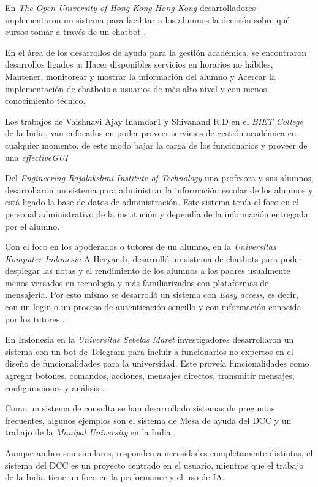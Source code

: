     \par En \textit{The Open University of Hong Kong Hong Kong} desarrolladores implementaron un sistema para facilitar a los alumnos la decisión sobre qué cursos tomar a través de un chatbot \cite{ChunHo2018}.
    
    \par En el área de los desarrollos de ayuda para la gestión académica, se encontraron desarrollos ligados a: Hacer disponibles servicios en horarios no hábiles, Mantener, monitorear y mostrar la información del alumno y Acercar la implementación de chatbots a usuarios de más alto nivel y con menos conocimiento técnico.
    
    \par Los trabajos de Vaishnavi Ajay Inamdar1 y Shivanand R.D en el \textit{BIET College} de la India, van enfocados en poder proveer servicios de gestión académica en cualquier momento, de este modo bajar la carga de los funcionarios y proveer de una \textit{\gls{effectiveGUI}} \cite{Journal2019}
    
    \par Del \textit{Engineering Rajalakshmi Institute of Technology} una profesora y sus alumnos, desarrollaron un sistema para administrar la información escolar de los alumnos y está ligado la base de datos de administración. Este sistema tenía el foco en el personal administrativo de la institución y dependía de la información entregada por el alumno.
    
    \par Con el foco en los apoderados o tutores de un alumno, en la \textit{Universitas Komputer Indonesia} A Heryandi, desarrolló un sistema de chatbots para poder desplegar las notas y el rendimiento de los alumnos a los padres usualmente menos versados en tecnología y más familiarizados con plataformas de mensajería. Por esto mismo se desarrolló un sistema con \textit{Easy access}, es decir, con un login o un proceso de autenticación sencillo y con información conocida por los tutores \cite{Heryandi2020}.
    
    \par En Indonesia en la \textit{Universitas Sebelas Maret} investigadores desarrollaron un sistema con un bot de Telegram para incluir a funcionarios no expertos en el diseño de funcionalidades para la universidad. Este proveía funcionalidades como agregar botones, comandos, acciones, mensajes directos, transmitir mensajes, configuraciones y análisis \cite{Hasyim_2021}.
    
    \par Como un sistema de consulta se han desarrollado sistemas de preguntas frecuentes, algunos ejemplos son el sistema de Mesa de ayuda del DCC \cite{ARANCIBIA2021} y un trabajo de la \textit{Manipal University} en la India \cite{Ranoliya2017}.
    \par Aunque ambos son similares, responden a necesidades completamente distintas, el sistema del DCC es un proyecto centrado en el usuario, mientras que el trabajo de la India tiene un foco en la performance y el uso de IA.
    
